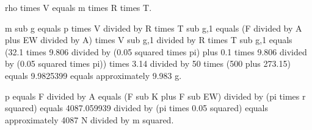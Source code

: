rho times V equals m times R times T.  

m sub g equals p times V divided by R times T sub g,1 equals (F divided by A plus EW divided by A) times V sub g,1 divided by R times T sub g,1 equals (32.1 times 9.806 divided by (0.05 squared times pi) plus 0.1 times 9.806 divided by (0.05 squared times pi)) times 3.14 divided by 50 times (500 plus 273.15) equals 9.9825399 equals approximately 9.983 g.  

p equals F divided by A equals (F sub K plus F sub EW) divided by (pi times r squared) equals 4087.059939 divided by (pi times 0.05 squared) equals approximately 4087 N divided by m squared.